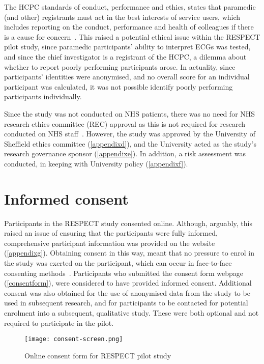 The HCPC standards of conduct, performance and ethics, states that paramedic (and other) registrants must act in the best interests of service users, which includes reporting on the conduct, performance and health of colleagues if there is a cause for concern~\citep{health_and_care_professions_council_standards_2008}. This raised a potential ethical issue within the RESPECT pilot study, since paramedic participants' ability to interpret ECGs was tested, and since the chief investigator is a registrant of the HCPC, a dilemma about whether to report poorly performing participants arose. In actuality, since participants' identities were anonymised, and no overall score for an individual participant was calculated, it was not possible identify poorly performing participants individually.

Since the study was not conducted on NHS patients, there was no need for NHS research ethics committee (REC) approval as this is not required for research conducted on NHS staff~\citep{nhs_research_ethics_service_does_2012}. However, the study was approved by the University of Sheffield ethics committee (\autoref{appendixd}), and the University acted as the study's research governance sponsor (\autoref{appendixe}). In addition, a risk assessment was conducted, in keeping with University policy (\autoref{appendixf}). 

\section{Informed consent}
\label{informedconsent}

Participants in the RESPECT study consented online. Although, arguably, this raised an issue of ensuring that the participants were fully informed, comprehensive participant information was provided on the website (\autoref{appendixg}). Obtaining consent in this way, meant that no pressure to enrol in the study was exerted on the participant, which can occur in face-to-face consenting methods~\citep{fielding_handbook_2008}. Participants who submitted the consent form webpage (\autoref{consentform}), were considered to have provided informed consent. Additional consent was also obtained for the use of anonymised data from the study to be used in subsequent research, and for participants to be contacted for potential enrolment into a subsequent, qualitative study. These were both optional and not required to participate in the pilot.

\begin{figure}[htbp]
\centering
\texttt{[image: consent-screen.png]}
\caption{Online consent form for RESPECT pilot study}
\label{consentform}
\end{figure}



